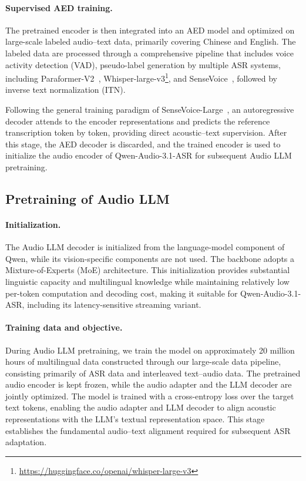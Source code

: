 \documentclass{article}
\begin{document}
\paragraph{Supervised AED training.}
The pretrained encoder is then integrated into an AED model and optimized on large-scale labeled audio--text data, primarily covering Chinese and English. The labeled data are processed through a comprehensive pipeline that includes voice activity detection (VAD), pseudo-label generation by multiple ASR systems, including Paraformer-V2~\citep{DBLP:journals/corr/abs-2409-17746}, Whisper-large-v3\footnote{\url{https://huggingface.co/openai/whisper-large-v3}}, and SenseVoice~\citep{DBLP:journals/corr/abs-2407-04051}, followed by inverse text normalization (ITN).

Following the general training paradigm of SenseVoice-Large~\citep{DBLP:journals/corr/abs-2407-04051}, an autoregressive decoder attends to the encoder representations and predicts the reference transcription token by token, providing direct acoustic--text supervision. After this stage, the AED decoder is discarded, and the trained encoder is used to initialize the audio encoder of Qwen-Audio-3.1-ASR for subsequent Audio LLM pretraining.

\subsection{Pretraining of Audio LLM}
\label{subsec:pretraining-llm}
%
\paragraph{Initialization.}
The Audio LLM decoder is initialized from the language-model component of Qwen, while its vision-specific components are not used. The backbone adopts a Mixture-of-Experts (MoE) architecture. This initialization provides substantial linguistic capacity and multilingual knowledge while maintaining relatively low per-token computation and decoding cost, making it suitable for Qwen-Audio-3.1-ASR, including its latency-sensitive streaming variant.

\paragraph{Training data and objective.}
During Audio LLM pretraining, we train the model on approximately 20 million hours of multilingual data constructed through our large-scale data pipeline, consisting primarily of ASR data and interleaved text--audio data. The pretrained audio encoder is kept frozen, while the audio adapter and the LLM decoder are jointly optimized.
The model is trained with a cross-entropy loss over the target text tokens, enabling the audio adapter and LLM decoder to align acoustic representations with the LLM's textual representation space. This stage establishes the
fundamental audio--text alignment required for subsequent ASR adaptation.
\end{document}
